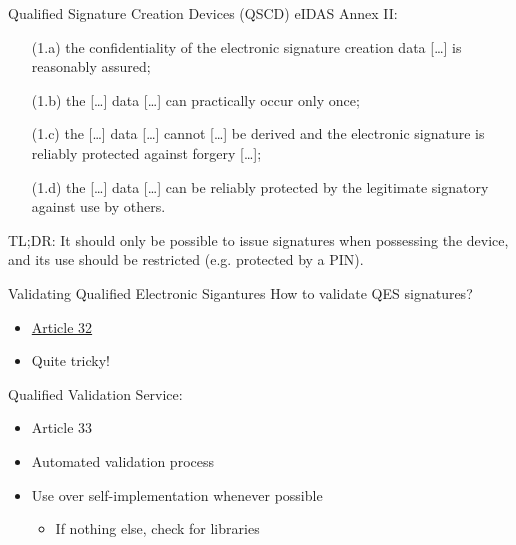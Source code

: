 \begin{frame}{Qualified Signature Creation Devices (QSCD)}
  \pause
  eIDAS Annex II:
  \begin{enumerate}[<+(1)->]
    \item[(1.a)] the confidentiality of the electronic signature creation data [\dots] is reasonably assured;
    \item[(1.b)] the [\dots] data [\dots] can practically occur only once;
    \item[(1.c)] the [\dots] data [\dots] cannot [\dots] be derived and the electronic signature is reliably protected against forgery [\dots];
    \item[(1.d)] the [\dots] data [\dots] can be reliably protected by the legitimate signatory against use by others.
  \end{enumerate}

  \pause
  TL;DR: It should only be possible to issue signatures when possessing the device, and its use should be restricted (e.g. protected by a PIN).
\end{frame}

\begin{frame}{Validating Qualified Electronic Sigantures}
  How to validate QES signatures?
  \begin{itemize}[<+(1)->]
    \item \href{https://eur-lex.europa.eu/legal-content/EN/TXT/HTML/?uri=CELEX\%3A32014R0910\#d1e2594-73-1}{Article 32}
    \item Quite tricky!
  \end{itemize}

  \vspace*{1em}

  \pause
  Qualified Validation Service:
  \begin{itemize}
    \item Article 33
    \item Automated validation process
    \item Use over self-implementation whenever possible
    \begin{itemize}
      \item If nothing else, check for libraries
    \end{itemize}
  \end{itemize}
\end{frame}

